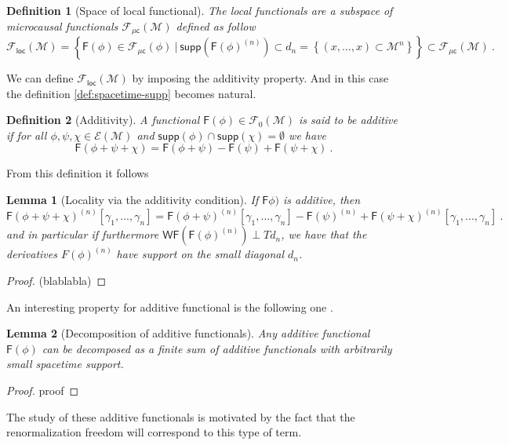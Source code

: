 \documentclass[10pt]{book}
\newcommand{\supp}{\mathsf{supp}}
\newcommand{\WF}{\mathsf{WF}}
\newcommand{\Ecal}{\mathcal{E}}
\newcommand{\Fcal}{\mathcal{F}}
\newcommand{\Mcal}{\mathcal{M}}
\newcommand{\Fsf}{\mathsf{F}}
\newcommand{\csf}{\mathsf{c}}
\theoremstyle{break}
\newtheorem{lemma}{Lemma}
\newtheorem{definition}{Definition}
\newtheorem{proof}{Proof}
\begin{document}
%
\begin{definition}[Space of local functional]
The local functionals are a subspace of microcausal functionals $\Fcal_{\mathsf{\mu c}}(\Mcal)$ defined as follow
%
\begin{equation*}
\Fcal_{\mathsf{loc}}(\Mcal) = \left\{ \Fsf(\phi) \in \Fcal_{\mu\csf}(\phi) \ \bigg| \ \supp\left(\Fsf(\phi)^{(n)}\right) \subset d_n = \left\{ (x,\dots,x) \subset \Mcal^n \right\} \right\} \subset \Fcal_{\mu\csf}(\Mcal) \ .
\end{equation*}
%
\end{definition}
%
We can define $\Fcal_{\mathsf{loc}}(\Mcal)$ by imposing the additivity property. And in this case the definition \ref{def:spacetime-supp} becomes natural.
%
\begin{definition}[Additivity]
A functional $\Fsf(\phi) \in \Fcal_0(\Mcal)$ is said to be additive if for all $\phi, \psi, \chi \in \Ecal(\Mcal)$ and $\supp(\phi) \cap \supp(\chi) = \emptyset$ we have 
%
\begin{equation*}
\Fsf(\phi + \psi + \chi) = \Fsf(\phi + \psi) - \Fsf(\psi) + \Fsf(\psi + \chi) \ . 
\end{equation*}
%
\end{definition}
%
%
From this definition it follows
%
\begin{lemma}[Locality via the additivity condition]
If $\Fsf\phi)$ is additive, then
\begin{equation*}
\Fsf(\phi + \psi + \chi)^{(n)}[\gamma_1,...,\gamma_n] = \Fsf(\phi + \psi)^{(n)}[\gamma_1,...,\gamma_n] - \Fsf(\psi)^{(n)} + \Fsf(\psi + \chi)^{(n)}[\gamma_1,...,\gamma_n] \ . 
\end{equation*}
and in particular if furthermore $\WF\left(\Fsf(\phi)^{(n)}\right) \perp Td_n$, we have that the derivatives $F(\phi)^{(n)}$ have support on the small diagonal $d_n$. 
\end{lemma}
%
\begin{proof}
(blablabla)
\end{proof}

%
An interesting property for additive functional is the following one \cite[Lemma 2.3.5]{Brunetti:2012ar}.
%
\begin{lemma}[Decomposition of additive functionals]
Any additive functional $\Fsf(\phi)$ can be decomposed as a finite sum of additive functionals with arbitrarily small spacetime support.
\end{lemma}
%
\begin{proof}
proof
\end{proof}
%
The study of these additive functionals is motivated by the fact that the renormalization freedom will correspond to this type of term.
\end{document}
